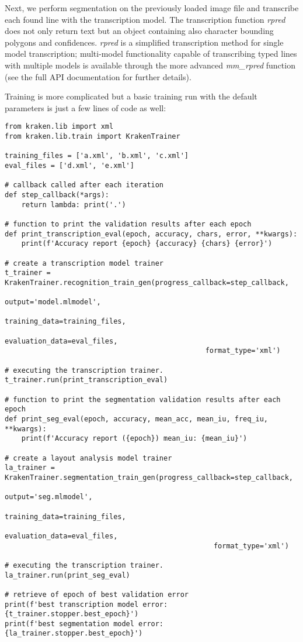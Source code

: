 Next, we perform segmentation on the previously loaded image file and
transcribe each found line with the transcription model. The transcription
function \emph{rpred} does not only return text but an object containing also
character bounding polygons and confidences. \emph{rpred} is a simplified
transcription method for single model transcription; multi-model functionality
capable of transcribing typed lines with multiple models is available through
the more advanced \emph{mm\_rpred} function (see the full API documentation for
further details).

Training is more complicated but a basic training run with the default
parameters is just a few lines of code as well:

\begin{verbatim}
from kraken.lib import xml
from kraken.lib.train import KrakenTrainer

training_files = ['a.xml', 'b.xml', 'c.xml']
eval_files = ['d.xml', 'e.xml']

# callback called after each iteration 
def step_callback(*args):
    return lambda: print('.')

# function to print the validation results after each epoch
def print_transcription_eval(epoch, accuracy, chars, error, **kwargs):
    print(f'Accuracy report {epoch} {accuracy} {chars} {error}')

# create a transcription model trainer
t_trainer = KrakenTrainer.recognition_train_gen(progress_callback=step_callback,
                                                output='model.mlmodel',
                                                training_data=training_files,
                                                evaluation_data=eval_files,
                                                format_type='xml')

# executing the transcription trainer.
t_trainer.run(print_transcription_eval)

# function to print the segmentation validation results after each epoch
def print_seg_eval(epoch, accuracy, mean_acc, mean_iu, freq_iu, **kwargs):
    print(f'Accuracy report ({epoch}) mean_iu: {mean_iu}')

# create a layout analysis model trainer
la_trainer = KrakenTrainer.segmentation_train_gen(progress_callback=step_callback,
                                                  output='seg.mlmodel',
                                                  training_data=training_files,
                                                  evaluation_data=eval_files,
                                                  format_type='xml')

# executing the transcription trainer.
la_trainer.run(print_seg_eval)

# retrieve of epoch of best validation error
print(f'best transcription model error: {t_trainer.stopper.best_epoch}')
print(f'best segmentation model error: {la_trainer.stopper.best_epoch}')
\end{verbatim}

